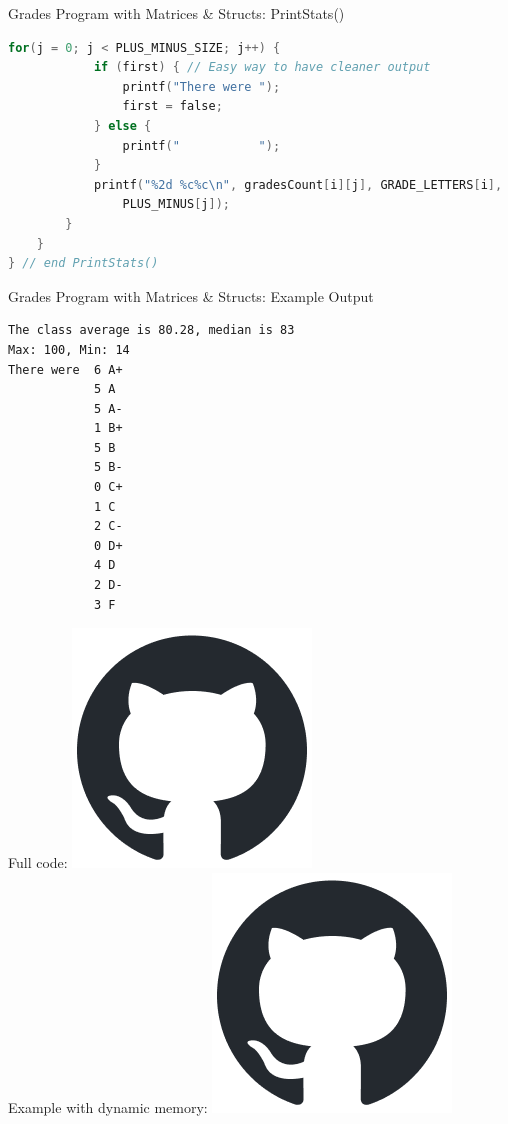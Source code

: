\documentclass[graphics]{beamer}
\begin{document}
\begin{frame}[fragile]{Grades Program with Matrices \& Structs: PrintStats()}
    \begin{lstlisting}[language=C,basicstyle=\scriptsize,keywordstyle=\color{blue},commentstyle=\color{green},showstringspaces=false,stringstyle=\color{red}]
        for(j = 0; j < PLUS_MINUS_SIZE; j++) {
            if (first) { // Easy way to have cleaner output
                printf("There were ");
                first = false;
            } else {
                printf("           ");
            }
            printf("%2d %c%c\n", gradesCount[i][j], GRADE_LETTERS[i],
                PLUS_MINUS[j]);
        }
    }
} // end PrintStats()
\end{lstlisting}
\end{frame}

\begin{frame}[fragile]{Grades Program with Matrices \& Structs: Example Output}
    \scriptsize
    \begin{verbatim}
The class average is 80.28, median is 83
Max: 100, Min: 14
There were  6 A+
            5 A 
            5 A-
            1 B+
            5 B 
            5 B-
            0 C+
            1 C 
            2 C-
            0 D+
            4 D 
            2 D-
            3 F
    \end{verbatim}
    Full code:  \href{https://github.com/rjzak/CMSC104/blob/master/L19_Arrays2/grades_matrices.c}{\includegraphics[scale=0.2]{Images/github-mark.png}}\\
    Example with dynamic memory:  \href{https://github.com/rjzak/CMSC104/blob/master/L19_Arrays2/grades_matrices_dynamic.c}{\includegraphics[scale=0.2]{Images/github-mark.png}}
\end{frame}
\end{document}
